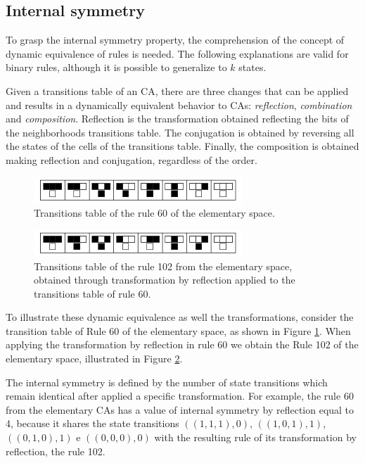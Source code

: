 \documentclass{llncs}
\begin{document}
\subsection{Internal symmetry}
To grasp the internal symmetry property, the comprehension of the concept of dynamic equivalence of rules is needed. The following explanations are valid for binary rules, although it is possible to generalize to $k$ states.

Given a transitions table of an CA, there are three changes that can be applied and results in a dynamically equivalent behavior to CAs: \textit{reflection}, \textit{combination} and \textit{composition}. Reflection is the transformation obtained reflecting the bits of the neighborhoods transitions table. The conjugation is obtained by reversing all the states of the cells of the transitions table. Finally, the composition is obtained making reflection and conjugation, regardless of the order.

  \begin{figure}[!ht]
    \centering
    \includegraphics[width=0.7\textwidth]{fig_ruleIcon60.png}
    \caption{Transitions table of the rule 60 of the elementary space.}
    \label{fig:table60}
  \end{figure}
  \begin{figure}[!ht]
    \centering
    \includegraphics[width=0.7\textwidth]{fig_ruleIcon102.png}
    \caption{Transitions table of the rule 102 from the elementary space, obtained through transformation by reflection applied to the transitions table of rule 60.}
    \label{fig:table102}
  \end{figure}

To illustrate these dynamic equivalence as well the transformations, consider the transition table of Rule 60 of the elementary space, as shown in Figure \ref{fig:table60}. When applying the transformation by reflection in rule 60 we obtain the Rule 102 of the elementary space, illustrated in Figure \ref{fig:table102}.

The internal symmetry is defined by the number of state transitions which remain identical after applied a specific transformation. For example, the rule 60 from the elementary CAs has a value of internal symmetry by reflection equal to 4, because it shares the state transitions $((1,1,1),0)$, $((1,0,1),1)$, $((0,1,0),1)$ e $ ((0,0,0),0)$ with the resulting rule of its transformation by reflection, the rule 102.
\end{document}
